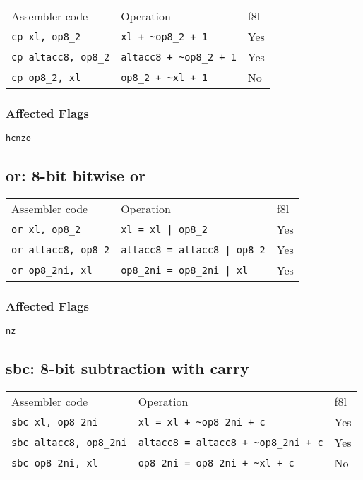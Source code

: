 \documentclass{book}
\begin{document}
\begin{tabular}{l l l}
Assembler code              & Operation                      & f8l\\
\texttt{cp xl, op8\_2}      & \texttt{xl + \~{}op8\_2 + 1}      & Yes \\
\texttt{cp altacc8, op8\_2} & \texttt{altacc8 + \~{}op8\_2 + 1} & Yes \\
\texttt{cp op8\_2, xl}      & \texttt{op8\_2 + \~{}xl + 1}      & No
\end{tabular}

\subsubsection*{Affected Flags}

\texttt{hcnzo}


\subsection{or: 8-bit bitwise or}

\begin{tabular}{l l l}
Assembler code              & Operation                           & f8l \\
\texttt{or xl, op8\_2}      & \texttt{xl = xl | op8\_2}           & Yes \\
\texttt{or altacc8, op8\_2} & \texttt{altacc8 = altacc8 | op8\_2} & Yes \\
\texttt{or op8\_2ni, xl}    & \texttt{op8\_2ni = op8\_2ni | xl}   & Yes
\end{tabular}

\subsubsection*{Affected Flags}

\texttt{nz}


\subsection{sbc: 8-bit subtraction with carry}

\begin{tabular}{l l l}
Assembler code                 & Operation                                  & f8l \\
\texttt{sbc xl, op8\_2ni}      & \texttt{xl = xl + \~{}op8\_2ni + c}           & Yes \\
\texttt{sbc altacc8, op8\_2ni} & \texttt{altacc8 = altacc8 + \~{}op8\_2ni + c} & Yes \\
\texttt{sbc op8\_2ni, xl}      & \texttt{op8\_2ni = op8\_2ni + \~{}xl + c}     & No
\end{tabular}
\end{document}
